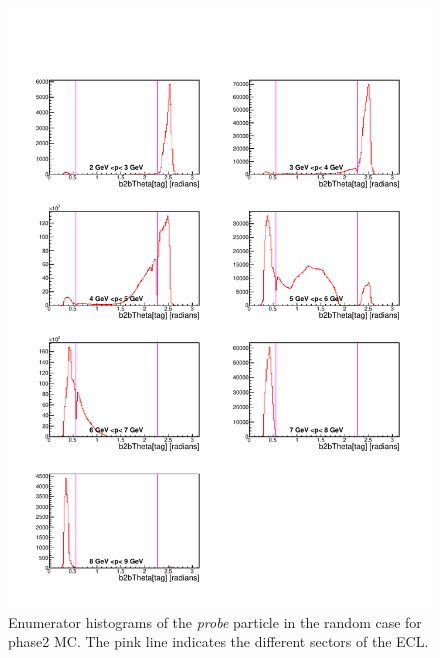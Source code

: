 \documentclass[a4paper,11pt,twosided,final,german,openbib,pdftex,listof=totoc,bibliography=totoc]{scrbook}
\begin{document}
\begin{appendix}
\begin{figure}[!htbp]
	\centering
	\includegraphics[width=\textwidth]{Plots/master/xPMThetaRandomE_MC}
	\caption[Momentum $\theta$ Random Enumerator Histogram Phase2 MC]{Enumerator histograms of the \textit{probe} particle in the random case for phase2 MC. The pink line indicates the different sectors of the ECL.}
	\label{plt:PMThetaRandomE_MC}
\end{figure}


\end{appendix}
\end{document}
